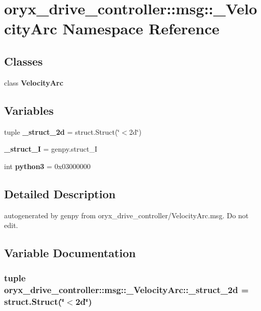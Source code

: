 \section{oryx\-\_\-drive\-\_\-controller\-:\-:msg\-:\-:\-\_\-\-Velocity\-Arc \-Namespace \-Reference}
\label{namespaceoryx__drive__controller_1_1msg_1_1__VelocityArc}
\subsection*{\-Classes}
\begin{DoxyCompactItemize}
\item 
class {\bf \-Velocity\-Arc}
\end{DoxyCompactItemize}
\subsection*{\-Variables}
\begin{DoxyCompactItemize}
\item 
tuple {\bf \-\_\-struct\-\_\-2d} = struct.\-Struct(\char`\"{}$<$2d\char`\"{})
\item 
{\bf \-\_\-struct\-\_\-\-I} = genpy.\-struct\-\_\-\-I
\item 
int {\bf python3} = 0x03000000
\end{DoxyCompactItemize}


\subsection{\-Detailed \-Description}
\begin{DoxyVerb}autogenerated by genpy from oryx_drive_controller/VelocityArc.msg. Do not edit.\end{DoxyVerb}
 

\subsection{\-Variable \-Documentation}
\subsubsection[{\-\_\-struct\-\_\-2d}]{\setlength{\rightskip}{0pt plus 5cm}tuple {\bf oryx\-\_\-drive\-\_\-controller\-::msg\-::\-\_\-\-Velocity\-Arc\-::\-\_\-struct\-\_\-2d} = struct.\-Struct(\char`\"{}$<$2d\char`\"{})}\label{namespaceoryx__drive__controller_1_1msg_1_1__VelocityArc_a4f1b82ffecf7cc1b9c9caadc2181f76a}


